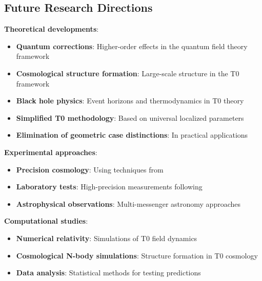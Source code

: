 \documentclass[12pt,a4paper]{article}
\begin{document}
	\subsection{Future Research Directions}
	\label{subsec:future_research}
	
	\textbf{Theoretical developments}:
	\begin{itemize}
		\item \textbf{Quantum corrections}: Higher-order effects in the quantum field theory framework
		\item \textbf{Cosmological structure formation}: Large-scale structure in the T0 framework
		\item \textbf{Black hole physics}: Event horizons and thermodynamics in T0 theory
		\item \textbf{Simplified T0 methodology}: Based on universal localized parameters
		\item \textbf{Elimination of geometric case distinctions}: In practical applications
	\end{itemize}
	
	\textbf{Experimental approaches}:
	\begin{itemize}
		\item \textbf{Precision cosmology}: Using techniques from \citep{weinberg2008,planck2020}
		\item \textbf{Laboratory tests}: High-precision measurements following \citep{will2014}
		\item \textbf{Astrophysical observations}: Multi-messenger astronomy approaches \citep{abbott2017}
	\end{itemize}
	
	\textbf{Computational studies}:
	\begin{itemize}
		\item \textbf{Numerical relativity}: Simulations of T0 field dynamics
		\item \textbf{Cosmological N-body simulations}: Structure formation in T0 cosmology
		\item \textbf{Data analysis}: Statistical methods for testing predictions
	\end{itemize}
	
\end{document}
